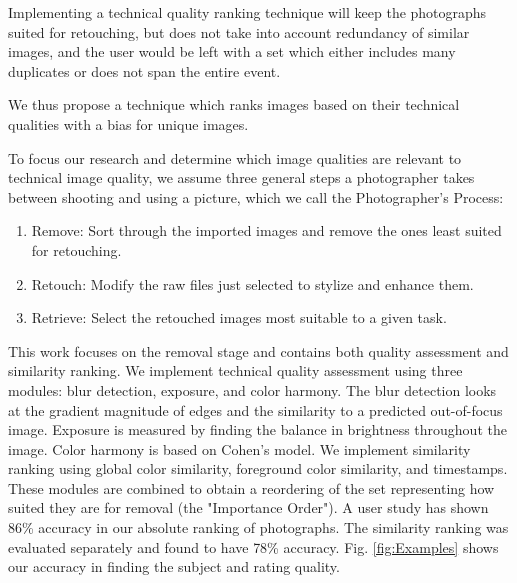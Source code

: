 \documentclass{article}
\begin{document}

Implementing a technical quality ranking technique will keep the photographs suited for retouching, but does not take into account redundancy of similar images, and the user would be left with a set which either includes many duplicates or does not span the entire event.


We thus propose a technique which ranks images based on their technical qualities with a bias for unique images.%

To focus our research and determine which image qualities are relevant to technical image quality, we assume three general steps a photographer takes between shooting and using a picture, which we call the Photographer's Process:
\begin{enumerate}
\item Remove: Sort through the imported images and remove the ones least suited for retouching.
\item Retouch: Modify the raw files just selected to stylize and enhance them.
\item Retrieve: Select the retouched images most suitable to a given task.
\end{enumerate}

This work focuses on the removal stage and contains both quality assessment and similarity ranking. We implement technical quality assessment using three modules: blur detection, exposure, and color harmony. The blur detection looks at the gradient magnitude of edges and the similarity to a predicted out-of-focus image. Exposure is measured by finding the balance in brightness throughout the image. Color harmony is based on Cohen's model\cite{Cohen-Or:2006:CH:1179352.1141933}. We implement similarity ranking using global color similarity, foreground color similarity, and timestamps.  These modules are combined to obtain a reordering of the set representing how suited they are for removal (the "Importance Order"). A user study has shown 86\% accuracy in our absolute ranking of photographs. The similarity ranking was evaluated separately and found to have 78\% accuracy. Fig. \ref{fig:Examples} shows our accuracy in finding the subject and rating quality.%
\end{document}
